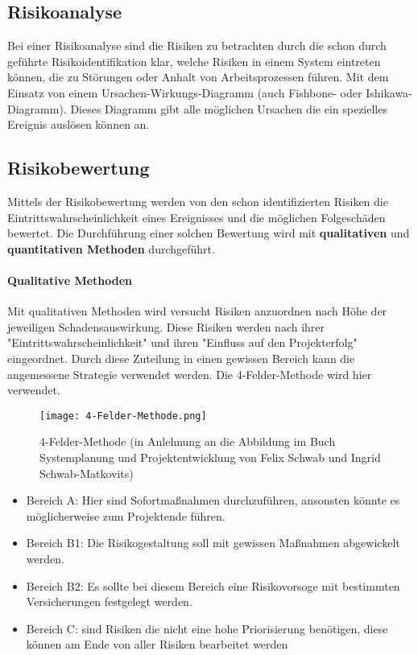 \subsection{Risikoanalyse}
Bei einer Risikoanalyse sind die Risiken zu betrachten durch die schon durch geführte Risikoidentifikation klar, welche Risiken in einem System eintreten können, die zu Störungen oder Anhalt von Arbeitsprozessen führen. Mit dem Einsatz von einem Ursachen-Wirkungs-Diagramm (auch Fishbone- oder Ishikawa-Diagramm). Dieses Diagramm gibt alle möglichen Ursachen die ein spezielles Ereignis auslösen können an.

\subsection{Risikobewertung}
Mittels der Risikobewertung werden von den schon identifizierten Risiken die Eintrittswahrscheinlichkeit eines Ereignisses und die möglichen Folgeschäden bewertet. Die Durchführung einer solchen Bewertung wird mit \textbf{qualitativen} und \textbf{quantitativen Methoden} durchgeführt.

\paragraph{Qualitative Methoden}
Mit qualitativen Methoden wird versucht Risiken anzuordnen nach Höhe der jeweiligen Schadensauswirkung.
Diese Risiken werden nach ihrer "Eintrittswahrscheinlichkeit" und ihren "Einfluss auf den Projekterfolg" eingeordnet. Durch diese Zuteilung in einen gewissen Bereich kann die angemessene Strategie verwendet werden. Die 4-Felder-Methode wird hier verwendet.

\begin{center}
\begin{figure}[h]
    \centering
    \texttt{[image: 4-Felder-Methode.png]}
    \caption{4-Felder-Methode (in Anlehnung an die Abbildung im Buch Systemplanung und Projektentwicklung von Felix Schwab und Ingrid Schwab-Matkovits)}
\end{figure}
\end{center}

\begin{itemize}
	\item Bereich A: Hier sind Sofortmaßnahmen durchzuführen, ansonsten könnte es möglicherweise zum Projektende führen.
	\item Bereich B1: Die Risikogestaltung soll mit gewissen Maßnahmen abgewickelt werden.
	\item Bereich B2: Es sollte bei diesem Bereich eine Risikovorsoge mit bestimmten Versicherungen festgelegt werden.
	\item Bereich C: sind Risiken die nicht eine hohe Priorisierung benötigen, diese können am Ende von aller Risiken bearbeitet werden
\end{itemize}

